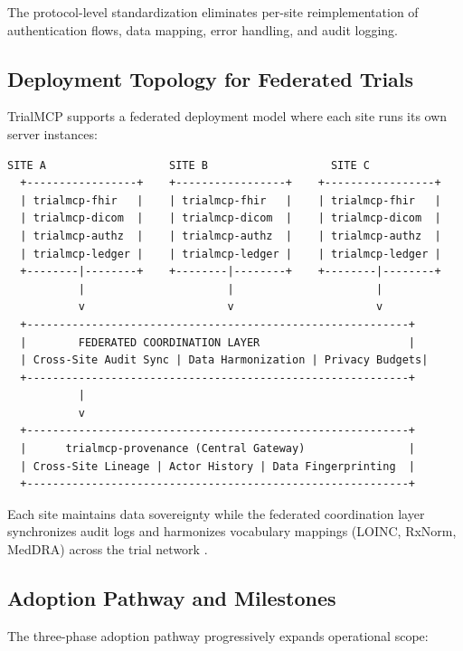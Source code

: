 \documentclass[10pt,letterpaper]{article}
\begin{document}
The protocol-level standardization eliminates per-site reimplementation of authentication flows, data mapping, error handling, and audit logging.

\subsection{Deployment Topology for Federated Trials}

TrialMCP supports a federated deployment model where each site runs its own server instances:

\begin{lstlisting}[title={\textbf{Federated Multi-Site Deployment Topology}}]
     SITE A                   SITE B                   SITE C
  +-----------------+    +-----------------+    +-----------------+
  | trialmcp-fhir   |    | trialmcp-fhir   |    | trialmcp-fhir   |
  | trialmcp-dicom  |    | trialmcp-dicom  |    | trialmcp-dicom  |
  | trialmcp-authz  |    | trialmcp-authz  |    | trialmcp-authz  |
  | trialmcp-ledger |    | trialmcp-ledger |    | trialmcp-ledger |
  +--------|--------+    +--------|--------+    +--------|--------+
           |                      |                      |
           v                      v                      v
  +-----------------------------------------------------------+
  |        FEDERATED COORDINATION LAYER                       |
  | Cross-Site Audit Sync | Data Harmonization | Privacy Budgets|
  +-----------------------------------------------------------+
           |
           v
  +-----------------------------------------------------------+
  |      trialmcp-provenance (Central Gateway)                |
  | Cross-Site Lineage | Actor History | Data Fingerprinting  |
  +-----------------------------------------------------------+
\end{lstlisting}

Each site maintains data sovereignty while the federated coordination layer synchronizes audit logs and harmonizes vocabulary mappings (LOINC, RxNorm, MedDRA) across the trial network \cite{kawchak2026fl}.

\subsection{Adoption Pathway and Milestones}

The three-phase adoption pathway progressively expands operational scope:
\end{document}
